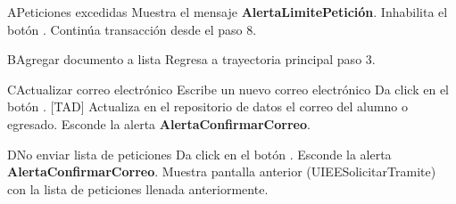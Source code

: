 \begin{UCtrayectoriaA}{A}{Peticiones excedidas} 
\UCpaso Muestra el mensaje {\bf AlertaLimitePetición}.
  \UCpaso Inhabilita el botón  	. 
  \UCpaso Continúa transacción desde el paso 8.
\end{UCtrayectoriaA}

\begin{UCtrayectoriaA}{B}{Agregar documento a lista} 
  \UCpaso Regresa a trayectoria principal paso 3.
\end{UCtrayectoriaA}

\begin{UCtrayectoriaA}{C}{Actualizar correo electrónico} 
  \UCpaso[\UCactor] Escribe un nuevo correo electrónico 
  \UCpaso[\UCactor] Da click en el botón . [TAD]
  \UCpaso Actualiza en el repositorio de datos el correo del alumno o egresado.
  \UCpaso Esconde la alerta {\bf AlertaConfirmarCorreo}.
\end{UCtrayectoriaA}

\begin{UCtrayectoriaA}{D}{No enviar lista de peticiones} 
 \UCpaso[\UCactor] Da click en el botón .
 \UCpaso Esconde la alerta  {\bf AlertaConfirmarCorreo}.
 \UCpaso Muestra pantalla anterior (UIEESolicitarTramite) con la lista de peticiones llenada anteriormente.
\end{UCtrayectoriaA}

